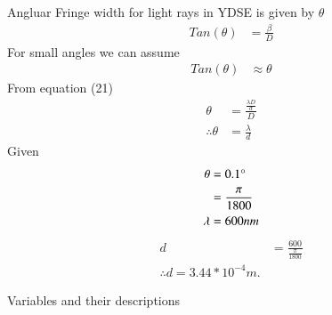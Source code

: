 \documentclass[journal,12pt,twocolumn]{IEEEtran}
\theoremstyle{remark}
\begin{document}
 Angluar Fringe width for light rays in YDSE is given by $\theta$
 \begin{align}
     Tan(\theta)&=\frac{\beta}{D}
 \end{align}
 For small angles we can assume 
 \begin{align}
     Tan(\theta)&\approx \theta
\end{align}
     From equation (21)
     \begin{align}
     \theta&=\frac{\frac{\lambda D}{d}}{D}\\
     \therefore \theta&=\frac{\lambda}{d}
 \end{align}
 Given
 \begin{align}
     \theta&=0.1\degree\\
&=\frac{\pi}{1800}\\
    \lambda&=600nm
 \end{align}
 \begin{align}
 d&=\frac{600}{\frac{\pi}{1800}}\\
 \therefore d= 3.44*10^{-4}m.
 \end{align}
 

 \renewcommand{\thefigure}{\theenumi}
 \renewcommand{\thetable}{\theenumi}

 \begin{flushleft}
     \begin{table}[h]
         \caption{Variables and their descriptions}
         \label{tab:table1.12.10.16}
         
     \end{table}

 \end{flushleft}
\end{document}
